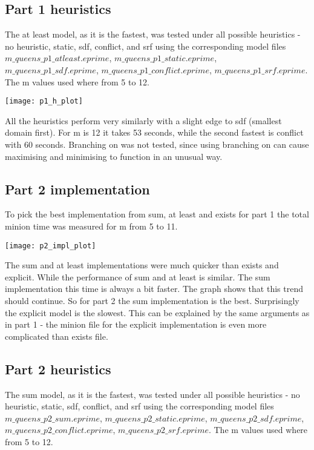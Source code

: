 \documentclass{article}
\begin{document}
\subsection{Part 1 heuristics}

The at least model, as it is the fastest, was tested under all possible heuristics - no heuristic, static, sdf, conflict, and srf using the corresponding model files $m\_queens\_p1\_atleast.eprime$, $m\_queens\_p1\_static.eprime$, $m\_queens\_p1\_sdf.eprime$, $m\_queens\_p1\_conflict.eprime$, $m\_queens\_p1\_srf.eprime$. The m values used where from 5 to 12.

\texttt{[image: p1\_h\_plot]}

All the heuristics perform very similarly with a slight edge to sdf (smallest domain first). For m is 12 it takes 53 seconds, while the second fastest is conflict with 60 seconds. Branching on was not tested, since using branching on can cause maximising and minimising to function in an unusual way.

\subsection{Part 2 implementation}

To pick the best implementation from sum, at least and exists for part 1 the total minion time was measured for m from 5 to 11.

\texttt{[image: p2\_impl\_plot]}

The sum and at least implementations were much quicker than exists and explicit. While the performance of sum and at least is similar. The sum implementation this time is always a bit faster. The graph shows that this trend should continue. So for part 2 the sum implementation is the best. Surprisingly the explicit model is the slowest. This can be explained by the same arguments as in part 1 - the minion file for the explicit implementation is even more complicated than exists file.

\subsection{Part 2 heuristics}

The sum model, as it is the fastest, was tested under all possible heuristics - no heuristic, static, sdf, conflict, and srf using the corresponding model files $m\_queens\_p2\_sum.eprime$, $m\_queens\_p2\_static.eprime$, $m\_queens\_p2\_sdf.eprime$, $m\_queens\_p2\_conflict.eprime$, $m\_queens\_p2\_srf.eprime$. The m values used where from 5 to 12.
\end{document}
